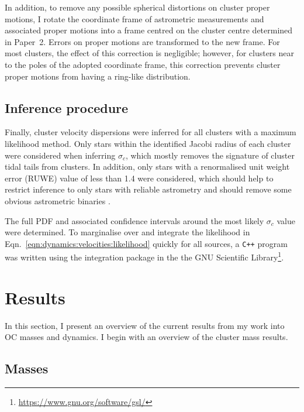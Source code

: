 In addition, to remove any possible spherical distortions on cluster proper motions, I rotate the coordinate frame of astrometric measurements and associated proper motions into a frame centred on the cluster centre determined in Paper~2. Errors on proper motions are transformed to the new frame. For most clusters, the effect of this correction is negligible; however, for clusters near to the poles of the adopted coordinate frame, this correction prevents cluster proper motions from having a ring-like distribution.

\subsection{Inference procedure}
\label{sec:dynamics:velocities:inference}

Finally, cluster velocity dispersions were inferred for all clusters with a maximum likelihood method. Only stars within the identified Jacobi radius of each cluster were considered when inferring $\sigma_c$, which mostly removes the signature of cluster tidal tails from clusters. In addition, only stars with a renormalised unit weight error (RUWE) value of less than 1.4 were considered, which should help to restrict inference to only stars with reliable astrometry and should remove some obvious astrometric binaries \citep{lindegren_gaia_2021,penoyre_astrometric_2022,penoyre_astrometric_2022-1}.

The full PDF and associated confidence intervals around the most likely $\sigma_c$ value were determined. To marginalise over and integrate the likelihood in Eqn.~\ref{eqn:dynamics:velocities:likelihood} quickly for all sources, a \texttt{C++} program was written using the integration package in the the GNU Scientific Library\footnote{\url{https://www.gnu.org/software/gsl/}}.


\section{Results}
\label{sec:dynamics:results}

In this section, I present an overview of the current results from my work into OC masses and dynamics. I begin with an overview of the cluster mass results.


\subsection{Masses}
\label{sec:dynamics:results:masses}

